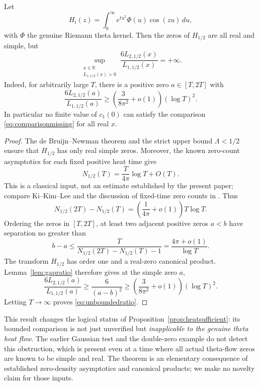 \begin{theorem}
\label{thm:heatgapobstruction}
Let
\[
H_t(z)=\int_0^\infty
e^{tu^2}\Phi(u)\cos(zu)\,du,
\]
with $\Phi$ the genuine Riemann theta kernel.
Then the zeros of $H_{1/2}$ are all real
and simple, but
\begin{equation}
\boxed{
\sup_{\substack{x\in\mathbb R\\
L_{1,1/2}(x)>0}}
\frac{6L_{2,1/2}(x)}
{L_{1,1/2}(x)}=+\infty.
}
\label{eq:unboundedratio}
\end{equation}
Indeed, for arbitrarily large $T$, there
is a positive zero $a\in[T,2T]$ with
\begin{equation}
\frac{6L_{2,1/2}(a)}
{L_{1,1/2}(a)}
\ge\left(\frac{3}{8\pi^2}
+o(1)\right)(\log T)^2 .
\label{eq:loggaplower}
\end{equation}
In particular no finite value of
$c_1(0)$ can satisfy the
comparison \eqref{eq:comparisonmissing}
for all real $x$.
\end{theorem}
\begin{proof}
The de Bruijn--Newman theorem and the
strict upper bound $\Lambda<1/2$
ensure that $H_{1/2}$ has only real
simple zeros. Moreover, the known
zero-count asymptotics for each
fixed positive heat time give
\[
N_{1/2}(T)
=\frac{T}{4\pi}\log T+O(T).
\]
This is a classical input, not an
estimate established by the present
paper; compare Ki--Kim--Lee
\cite{KiKimLee} and the discussion of
fixed-time zero counts in
\cite{Polymath15,RodgersTao}.
Thus
\[
N_{1/2}(2T)-N_{1/2}(T)
=\left(\frac1{4\pi}+o(1)\right)
T\log T.
\]
Ordering the zeros in $[T,2T]$,
at least two adjacent positive zeros
$a<b$ have separation no greater than
\[
b-a\le\frac{T}{N_{1/2}(2T)
-N_{1/2}(T)-1}
=\frac{4\pi+o(1)}{\log T}.
\]
The transform $H_{1/2}$ has order
one and a real-zero canonical product.
Lemma~\ref{lem:gapratio} therefore gives
at the simple zero $a$,
\[
\frac{6L_{2,1/2}(a)}
{L_{1,1/2}(a)}
\ge\frac6{(a-b)^2}
\ge\left(\frac{3}{8\pi^2}
+o(1)\right)(\log T)^2 .
\]
Letting $T\to\infty$ proves
\eqref{eq:unboundedratio}.
\end{proof}

This result changes the logical
status of Proposition~\ref{prop:heatsufficient}:
its bounded comparison is not just
unverified but \emph{inapplicable to
the genuine theta heat flow}.
The earlier Gaussian test and the
double-zero example do not detect this
obstruction, which is present even
at a time where all actual theta-flow
zeros are known to be simple and real.
The theorem is an elementary
consequence of established zero-density
asymptotics and canonical products;
we make no novelty claim for those inputs.

